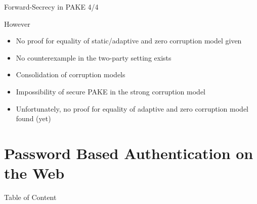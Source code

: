 \documentclass[notes,xcolor=dvipsnames]{beamer}
\begin{document}
\begin{frame}{Forward-Secrecy in PAKE 4/4}{}

	However
	\begin{itemize}
		\item No proof for equality of static/adaptive and zero corruption model given
		\item No counterexample in the two-party setting exists
	\end{itemize}
	
	\vspace*{2em}
	\begin{itemize}
		\item Consolidation of corruption models
		\item Impossibility of secure PAKE in the strong corruption model
		\item Unfortunately, no proof for equality of adaptive and zero corruption model found (yet)
	\end{itemize}

\end{frame}

\section{Password Based Authentication on the Web}

\begin{frame}{Table of Content}
\tableofcontents[currentsection]
\end{frame}

\newsavebox{\savelisting}
\newenvironment{listing}
{\vspace*{-2em}\begin{lrbox}{\savelisting}
\begin{minipage}{4.8in}
\begin{flushleft}}
{\end{flushleft}
\end{minipage}
\end{lrbox}
\begin{center}
\resizebox{\columnwidth}{!}{\setlength\fboxsep{6pt}\fbox{\usebox{\savelisting}}}
\end{center}}
\end{document}
